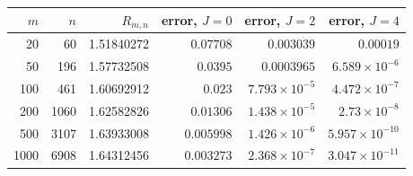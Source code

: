 \begin{tabular}{rrrrrr}
\toprule
$m$ & $n$ & $R_{m,n}$ & error, $J=0$ & error, $J=2$ & error, $J=4$\\
\midrule
20 & 60 & 1.51840272 & $0.07708$ & $0.003039$ & $0.00019$\\
50 & 196 & 1.57732508 & $0.0395$ & $0.0003965$ & $6.589\times10^{-6}$\\
100 & 461 & 1.60692912 & $0.023$ & $7.793\times10^{-5}$ & $4.472\times10^{-7}$\\
200 & 1060 & 1.62582826 & $0.01306$ & $1.438\times10^{-5}$ & $2.73\times10^{-8}$\\
500 & 3107 & 1.63933008 & $0.005998$ & $1.426\times10^{-6}$ & $5.957\times10^{-10}$\\
1000 & 6908 & 1.64312456 & $0.003273$ & $2.368\times10^{-7}$ & $3.047\times10^{-11}$\\
\bottomrule
\end{tabular}
